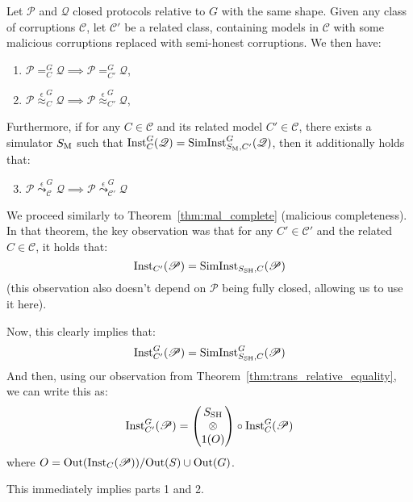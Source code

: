 \begin{theorem}
  Let $\mathscr{P}$ and $\mathscr{Q}$ closed protocols relative to $G$ with the same shape.
  Given any class of corruptions $\mathscr{C}$, let $\mathscr{C}'$ be a related class, containing
  models in $\mathscr{C}$ with some
  malicious corruptions replaced with semi-honest corruptions.
  We then have:
  \begin{enumerate}
    \item $\mathscr{P} =^G_{C} \mathscr{Q} \implies \mathscr{P} =^G_{C'} \mathscr{Q}$,
    \item $\mathscr{P} \overset{\epsilon}{\approx}^G_{C} \mathscr{Q} \implies \mathscr{P} \overset{\epsilon}{\approx}^G_{C'} \mathscr{Q}$,
  \end{enumerate}

  Furthermore, if for any $C \in \mathscr{C}$ and its related model $C' \in \mathscr{C}$,
  there exists a simulator $S_{\text{M}}$ such that $\text{Inst}^G_C(\mathscr{Q}) = \text{SimInst}^G_{S_{\text{M}}, C'}(\mathscr{Q})$,
  then it additionally holds that:
  \begin{enumerate}
    \setcounter{enumi}{2}
    \item $\mathscr{P} \overset{\epsilon}{\leadsto}^G_{\mathscr{C}} \mathscr{Q} \implies \mathscr{P} \overset{\epsilon}{\leadsto}^G_{\mathscr{C}'} \mathscr{Q}$
  \end{enumerate}

   We proceed similarly to Theorem~\ref{thm:mal_complete} (malicious completeness).
  In that theorem, the key observation was that for any $C' \in \mathscr{C}'$
  and the related $C \in \mathscr{C}$, it holds that:
  $$
  \text{Inst}_{C'}(\mathscr{P}) = \text{SimInst}_{S_{\text{SH}}, C}(\mathscr{P})
  $$
  (this observation also doesn't depend on $\mathscr{P}$ being fully closed,
  allowing us to use it here).

  Now, this clearly implies that:
  $$
  \text{Inst}_{C'}^G(\mathscr{P}) = \text{SimInst}^G_{S_{\text{SH}}, C}(\mathscr{P})
  $$
  And then, using our observation from Theorem~\ref{thm:trans_relative_equality},
  we can write this as:
  $$
  \text{Inst}_{C'}^G(\mathscr{P}) =
  \begin{pmatrix}
    S_{\text{SH}}\cr
    \otimes\cr
    1(O)
  \end{pmatrix}
  \circ
  \text{Inst}^G_C(\mathscr{P})
  $$
  where $O = \text{Out}(\text{Inst}_C(\mathscr{P})) / \text{Out}(S) \cup \text{Out}(G)$.

  This immediately implies parts 1 and 2.


\end{theorem}
